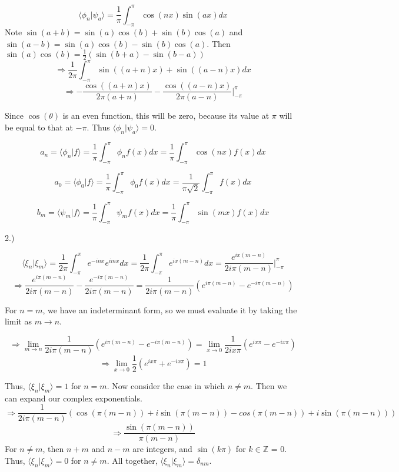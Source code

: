 \documentclass[12pt]{article}
\begin{document}
$$\langle \phi_n | \psi_a \rangle = \frac{1}{\pi} \int_{-\pi}^{\pi} \cos(nx) \sin(ax) dx$$
Note $\sin(a + b) = \sin(a)\cos(b) + \sin(b)\cos(a)$ and $\sin(a - b) = \sin(a)\cos(b) - \sin(b)\cos(a)$. Then $\sin(a)\cos(b) = \frac{1}{2}(\sin(b + a) - \sin(b - a))$
$$\Rightarrow \frac{1}{2\pi} \int_{-\pi}^{\pi}\sin((a + n)x) + \sin((a - n)x)dx$$
$$\Rightarrow -\frac{\cos((a + n)x)}{2\pi(a + n)} - \frac{\cos((a - n)x)}{2\pi(a - n)} \Big|_{-\pi}^{\pi}$$ 

Since $\cos(\theta)$ is an even function, this will be zero, because its value at $\pi$ will be equal to that at $-\pi$. Thus $\langle \phi_n | \psi_a \rangle = 0$.

$$a_n = \langle \phi_n | f \rangle = \frac{1}{\pi} \int_{-\pi}^{\pi} \phi_n f(x) dx =  \frac{1}{\pi} \int_{-\pi}^{\pi} \cos(nx) f(x) dx$$

$$a_0 = \langle \phi_0 | f \rangle = \frac{1}{\pi} \int_{-\pi}^{\pi} \phi_0 f(x) dx =  \frac{1}{\pi \sqrt{2}} \int_{-\pi}^{\pi} f(x) dx$$

$$b_m = \langle \psi_m | f \rangle = \frac{1}{\pi} \int_{-\pi}^{\pi} \psi_m f(x) dx =  \frac{1}{\pi} \int_{-\pi}^{\pi} \sin(mx) f(x) dx$$

\pagebreak

2.) 

$$\langle \xi_n | \xi_m \rangle = \frac{1}{2\pi} \int_{-\pi}^{\pi} e^{-inx}  e^{imx} dx = \frac{1}{2\pi} \int_{-\pi}^{\pi}e^{ix(m - n)} dx = \frac{e^{ix(m - n)}}{2i\pi (m - n)} \Big|_{-\pi}^{\pi}$$
$$\Rightarrow \frac{e^{i\pi(m - n)}}{2i\pi(m - n)} - \frac{e^{-i\pi(m - n)}}{2i\pi(m - n)} = \frac{1}{2i\pi(m - n)}(e^{i\pi(m - n)} - e^{-i\pi(m - n)})$$

For $n = m$, we have an indeterminant form, so we must evaluate it by taking the limit as $m \rightarrow n$.

$$\Rightarrow \lim_{m \rightarrow n} \frac{1}{2i\pi(m - n)}(e^{i\pi(m - n)} - e^{-i\pi(m - n)}) = \lim_{x \rightarrow 0} \frac{1}{2ix\pi}(e^{ix\pi} - e^{-ix\pi})$$
$$\Rightarrow \lim_{x \rightarrow 0} \frac{1}{2}(e^{ix\pi} + e^{-ix\pi}) = 1$$

Thus, $\langle \xi_n | \xi_m \rangle = 1$ for $n = m$. Now consider the case in which $n \neq m$. Then we can expand our complex exponentials.
$$\Rightarrow \frac{1}{2i\pi(m - n)}(\cos(\pi(m - n)) + i\sin(\pi(m - n)) - cos(\pi(m - n)) + i\sin(\pi(m - n)))$$
$$\Rightarrow \frac{\sin(\pi(m - n))}{\pi(m - n)}$$
For $n \neq m$, then $n + m$ and $n - m$ are integers, and $\sin(k\pi)$ for $k \in \mathbb{Z}$ = 0. Thus, $\langle \xi_n | \xi_m \rangle = 0$ for $n \neq m$. All together, $\langle \xi_n | \xi_m \rangle = \delta_{nm}.$
\end{document}
